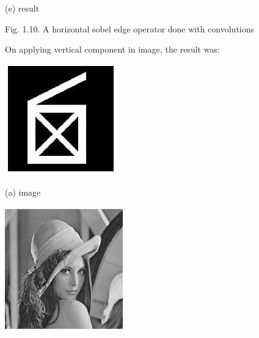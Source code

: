 \documentclass[10pt]{article}
\begin{document}
(e) result

Fig. 1.10. A horizontal sobel edge operator done with convolutions

On applying vertical component in image, the result was:

\includegraphics[max width=\textwidth]{2022_01_06_b5ce182ed1bd5f482e5bg-18}

(a) image

\includegraphics[max width=\textwidth]{2022_01_06_b5ce182ed1bd5f482e5bg-18(1)}
\end{document}
